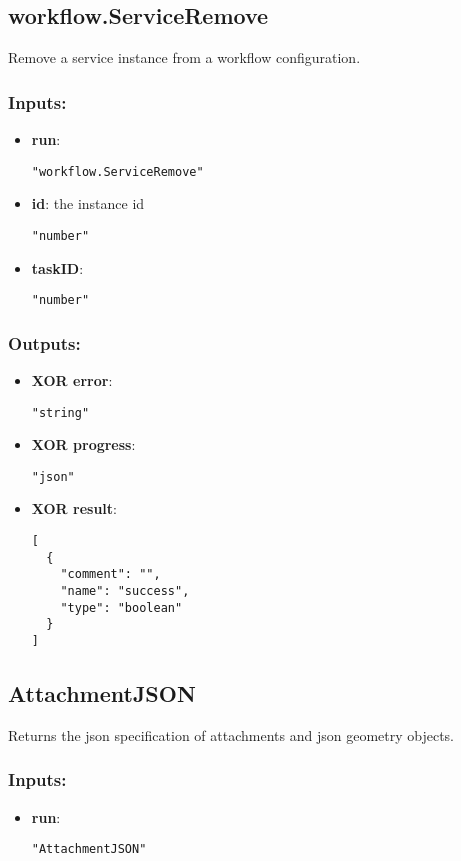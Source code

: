 \subsection{workflow.ServiceRemove}
Remove a service instance from a workflow configuration.
\subsubsection*{Inputs:}
\begin{itemize}
    \item \textbf{run}: 
\begin{lstlisting}
"workflow.ServiceRemove"
\end{lstlisting}
    \item \textbf{id}: the instance id
\begin{lstlisting}
"number"
\end{lstlisting}
    \item \textbf{taskID}: 
\begin{lstlisting}
"number"
\end{lstlisting}
  \end{itemize}

\subsubsection*{Outputs:}
\begin{itemize}
    \item \textbf{XOR error}: 
\begin{lstlisting}
"string"
\end{lstlisting}
    \item \textbf{XOR progress}: 
\begin{lstlisting}
"json"
\end{lstlisting}
    \item \textbf{XOR result}: 
\begin{lstlisting}
[
  {
    "comment": "", 
    "name": "success", 
    "type": "boolean"
  }
]
\end{lstlisting}
  \end{itemize}

\subsection{AttachmentJSON}
Returns the json specification of attachments and json geometry objects.
\subsubsection*{Inputs:}
\begin{itemize}
    \item \textbf{run}: 
\begin{lstlisting}
"AttachmentJSON"
\end{lstlisting}
  \end{itemize}

